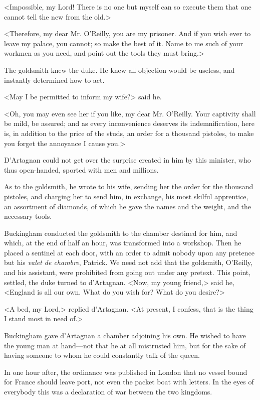 <Impossible, my Lord! There is no one but myself can so execute them that one cannot tell the new from the old.> 

<Therefore, my dear Mr. O'Reilly, you are my prisoner. And if you wish ever to leave my palace, you cannot; so make the best of it. Name to me such of your workmen as you need, and point out the tools they must bring.> 

The goldsmith knew the duke. He knew all objection would be useless, and instantly determined how to act. 

<May I be permitted to inform my wife?> said he. 

<Oh, you may even see her if you like, my dear Mr. O'Reilly. Your captivity shall be mild, be assured; and as every inconvenience deserves its indemnification, here is, in addition to the price of the studs, an order for a thousand pistoles, to make you forget the annoyance I cause you.> 

D'Artagnan could not get over the surprise created in him by this minister, who thus open-handed, sported with men and millions. 

As to the goldsmith, he wrote to his wife, sending her the order for the thousand pistoles, and charging her to send him, in exchange, his most skilful apprentice, an assortment of diamonds, of which he gave the names and the weight, and the necessary tools. 

Buckingham conducted the goldsmith to the chamber destined for him, and which, at the end of half an hour, was transformed into a workshop. Then he placed a sentinel at each door, with an order to admit nobody upon any pretence but his \textit{valet de chambre}, Patrick. We need not add that the goldsmith, O'Reilly, and his assistant, were prohibited from going out under any pretext. This point, settled, the duke turned to d'Artagnan. <Now, my young friend,> said he, <England is all our own. What do you wish for? What do you desire?> 

<A bed, my Lord,> replied d'Artagnan. <At present, I confess, that is the thing I stand most in need of.> 

Buckingham gave d'Artagnan a chamber adjoining his own. He wished to have the young man at hand---not that he at all mistrusted him, but for the sake of having someone to whom he could constantly talk of the queen. 

In one hour after, the ordinance was published in London that no vessel bound for France should leave port, not even the packet boat with letters. In the eyes of everybody this was a declaration of war between the two kingdoms. 

